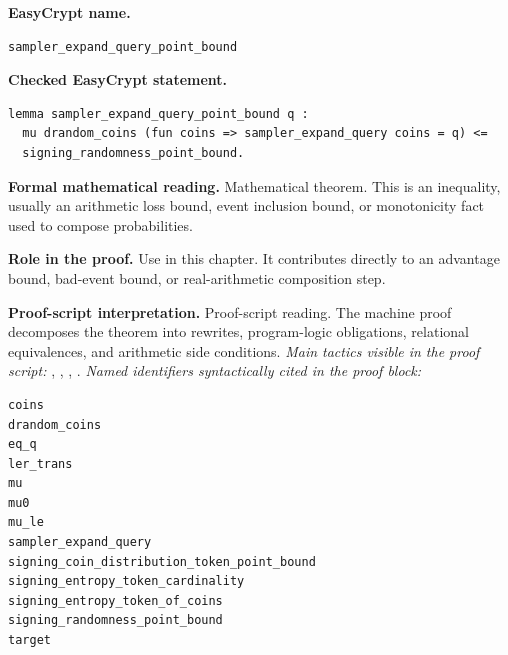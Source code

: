 \begin{formaltheorem}
\noindent\textbf{EasyCrypt name.}
\begin{lstlisting}[language=EasyCrypt,basicstyle=\ttfamily\scriptsize]
sampler_expand_query_point_bound
\end{lstlisting}
\noindent\textbf{Checked EasyCrypt statement.}
\begin{lstlisting}[language=EasyCrypt,basicstyle=\ttfamily\scriptsize]
lemma sampler_expand_query_point_bound q :
  mu drandom_coins (fun coins => sampler_expand_query coins = q) <=
  signing_randomness_point_bound.
\end{lstlisting}
\noindent\textbf{Formal mathematical reading.}
Mathematical theorem. This is an inequality, usually an arithmetic loss bound, event inclusion bound, or monotonicity fact used to compose probabilities.

\noindent\textbf{Role in the proof.}
Use in this chapter. It contributes directly to an advantage bound, bad-event bound, or real-arithmetic composition step.

\noindent\textbf{Proof-script interpretation.}
Proof-script reading. The machine proof decomposes the theorem into rewrites, program-logic obligations, relational equivalences, and arithmetic side conditions.
\emph{Main tactics visible in the proof script:} , , , .
\emph{Named identifiers syntactically cited in the proof block:}
\begin{lstlisting}[language=EasyCrypt,basicstyle=\ttfamily\scriptsize]
coins
drandom_coins
eq_q
ler_trans
mu
mu0
mu_le
sampler_expand_query
signing_coin_distribution_token_point_bound
signing_entropy_token_cardinality
signing_entropy_token_of_coins
signing_randomness_point_bound
target
\end{lstlisting}

\end{formaltheorem}

